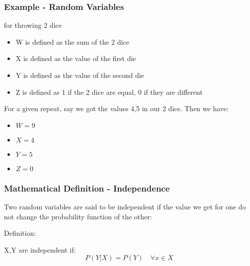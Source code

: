 \documentclass{beamer}
\begin{document}
\begin{frame}
\frametitle{Example - Random Variables}
for throwing 2 dice
\begin{itemize}
\item W is defined as the sum of the 2 dice
\item X is defined as the value of the first die
\item Y is defined as the value of the second die
\item Z is defined as 1 if the 2 dice are equal, 0 if they are different
\end{itemize}

For a given repeat, say we got the values 4,5 in our 2 dice. Then we have:
\begin{itemize}
\item $W=9$
\item $X=4$
\item $Y=5$
\item $Z=0$
\end{itemize}


\end{frame}

\begin{frame}
\frametitle{Mathematical Definition - Independence}
Two random variables are said to be independent if the value we get for one do not change the probability function of the other:

Definition:

X,Y are independent if:
$$P(Y|X)=P(Y) \quad \forall x \in X$$
\end{frame}
\end{document}
